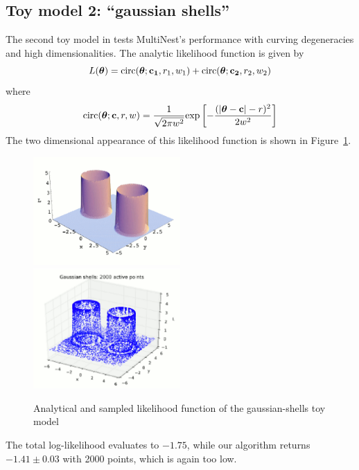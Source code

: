 \documentclass{article}
\begin{document}
\subsection{Toy model 2: ``gaussian shells''}
The second toy model in \cite{2009MNRAS.398.1601F} tests MultiNest's performance with curving degeneracies and high dimensionalities. The analytic likelihood function is given by
\[L(\mbox{\boldmath$\theta$}) = \mathrm{circ}(\mbox{\boldmath$\theta$};{\bf c_1},r_1,w_1)
+\mathrm{circ}(\mbox{\boldmath$\theta$};{\bf c_2},r_2,w_2)\]
where
\[ \mathrm{circ}(\mbox{\boldmath$\theta$};{\bf c},r,w) = \frac{1}{\sqrt{2\pi w^2}}\mathrm{exp}\left[-\frac{(|\mbox{\boldmath$\theta$} 
- {\bf c}|-r)^2}{2w^2}\right]\]
The two dimensional appearance of this likelihood function is shown in Figure~\ref{gaussshell}.

\begin{figure}[h]
\includegraphics[width=0.5\textwidth]{figures/gauss_shells_analytic_s.eps}
\includegraphics[width=0.5\textwidth]{figures/gauss_shells_s.eps}
\caption{Analytical and sampled likelihood function of the gaussian-shells toy model}
\label{gaussshell}
\end{figure}

The total log-likelihood evaluates to $-1.75$, while our algorithm returns $-1.41\pm 0.03$  with 2000 points, which is again too low.
\end{document}
